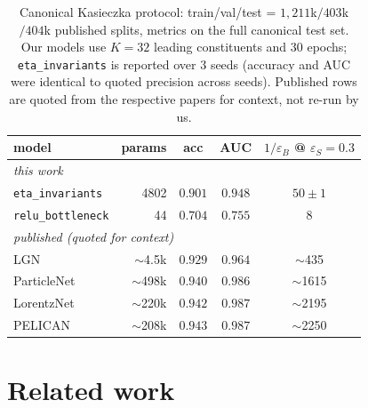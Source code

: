 \documentclass[11pt]{article}
\begin{document}
\begin{table}[t]
  \centering
  \caption{Canonical Kasieczka protocol: train/val/test =
    $1{,}211$k$/403$k$/404$k published splits, metrics on the full
    canonical test set. Our models use $K=32$ leading constituents and
    $30$ epochs; \texttt{eta\_invariants} is reported over $3$ seeds
    (accuracy and AUC were identical to quoted precision across
    seeds). Published rows are quoted from the respective papers for
    context, not re-run by us.}
  \label{tab:topt-canonical}
  \begin{tabular}{lrccc}
    \toprule
    model & params & acc & AUC & $1/\varepsilon_B$ @ $\varepsilon_S{=}0.3$ \\
    \midrule
    \multicolumn{5}{l}{\textit{this work}} \\
    \texttt{eta\_invariants}  & 4802 & $0.901$ & $0.948$ & $50 \pm 1$ \\
    \texttt{relu\_bottleneck} & 44   & $0.704$ & $0.755$ & $8$ \\
    \midrule
    \multicolumn{5}{l}{\textit{published (quoted for context)}} \\
    LGN~\citep{bogatskiy2020lgn}            & $\sim$4.5k  & $0.929$ & $0.964$  & $\sim$435 \\
    ParticleNet~\citep{qu2020particlenet}   & $\sim$498k  & $0.940$ & $0.986$  & $\sim$1615 \\
    LorentzNet~\citep{gong2022lorentznet}   & $\sim$220k  & $0.942$ & $0.987$  & $\sim$2195 \\
    PELICAN~\citep{bogatskiy2022pelican}    & $\sim$208k  & $0.943$ & $0.987$  & $\sim$2250 \\
    \bottomrule
  \end{tabular}
\end{table}

\section{Related work}
\label{sec:related}
\end{document}
